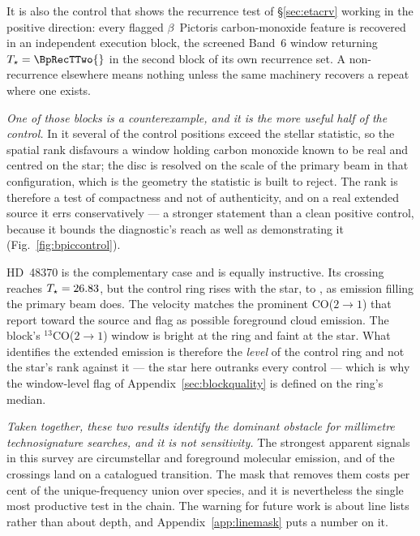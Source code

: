 It is also the control that shows the recurrence test of
\S\ref{sec:etacrv} working in the positive direction: every flagged
$\beta$~Pictoris carbon-monoxide feature is recovered in an independent
execution block, the screened Band~6 window returning
$T_\star=\BpRecTTwo{}$ in the second block of its own recurrence set. A
non-recurrence elsewhere means nothing unless the same machinery recovers a
repeat where one exists.

\emph{One of those blocks is a counterexample, and it is the more useful half
of the control.} In it several of the \NCtrl{} control positions exceed the
stellar statistic, so the spatial rank disfavours a window holding carbon
monoxide known to be real and centred on the star; the disc is resolved on
the scale of the primary beam in that configuration, which is the geometry
the statistic is built to reject. The rank is therefore a test of
compactness and not of authenticity, and on a real extended source it errs
conservatively --- a stronger statement than a clean positive control, because
it bounds the diagnostic's reach as well as demonstrating it
(Fig.~\ref{fig:bpiccontrol}).



HD~48370 is the complementary case and is equally instructive. Its crossing
reaches $T_\star=26.83$, but the control ring rises with the star, to
\HdRingMax, as emission filling the primary beam does. The velocity matches
the prominent CO($2{\to}1$) that \citet{Cataldi2023} report toward the
source and flag as possible foreground cloud emission. The block's
$^{13}$CO($2{\to}1$) window is bright at the ring and faint at the star.
What identifies the extended emission is therefore the \emph{level} of the
control ring and not the star's rank against it --- the star here outranks
every control --- which is why the window-level flag of
Appendix~\ref{sec:blockquality} is defined on the ring's median.

\emph{Taken together, these two results identify the dominant obstacle for
millimetre technosignature searches, and it is not sensitivity.} The
strongest apparent signals in this survey are circumstellar and foreground
molecular emission, and \NAttributed{} of the \NCross{} crossings land on a
catalogued transition. The mask that removes them costs \FrMaskPct{} per
cent of the unique-frequency union over \FrNSpec{} species, and it is
nevertheless the single most productive test in the chain. The warning for
future work is about line lists rather than about depth, and
Appendix~\ref{app:linemask} puts a number on it.

